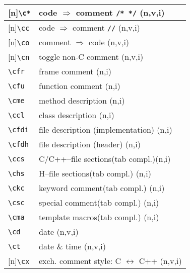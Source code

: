 \documentclass[oneside,11pt,landscape,DIV16]{scrartcl}
\newcommand{\Rep}{{\tiny{[n]}}}
\begin{document}
\begin{multicols}{3}
\begin{center}
\begin{tabular}[]{|p{10mm}|p{60mm}|}
\hline \Rep\verb'\c*'  & code $\Rightarrow$ comment \verb'/* */' \hfill (n,v,i)  \\
\hline \Rep\verb'\cc'  & code $\Rightarrow$ comment \verb'//'    \hfill (n,v,i)\\
\hline \Rep\verb'\co'  & comment $\Rightarrow$ code              \hfill (n,v,i)\\
\hline \Rep\verb'\cn'  & toggle non-C comment                    \hfill (n,v,i)\\
%
\hline \verb'\cfr' & frame comment                               \hfill (n,i)\\
\hline \verb'\cfu' & function comment                            \hfill (n,i)\\
\hline \verb'\cme' & method description                          \hfill (n,i)\\
\hline \verb'\ccl' & class description                           \hfill (n,i)\\
\hline \verb'\cfdi'& file description (implementation)           \hfill (n,i)\\
\hline \verb'\cfdh'& file description (header)                   \hfill (n,i)\\
%
\hline \verb'\ccs'& C/C++--file sections\hspace{3mm}\footnotesize{(tab compl.)}\hfill \normalsize{(n,i)}\\
\hline \verb'\chs'& H--file sections\hspace{10mm}\footnotesize{(tab compl.)}   \hfill \normalsize{(n,i)}\\
\hline \verb'\ckc'& keyword comment\hspace{5mm}\footnotesize{(tab compl.)}     \hfill \normalsize{(n,i)}\\
\hline \verb'\csc'& special comment\hspace{7,5mm}\footnotesize{(tab compl.)}   \hfill \normalsize{(n,i)}\\
\hline \verb'\cma'& template macros\hspace{7,5mm}\footnotesize{(tab compl.)}   \hfill \normalsize{(n,i)}\\
%
\hline \verb'\cd' & date                                                       \hfill (n,v,i)\\
\hline \verb'\ct' & date \& time                                               \hfill (n,v,i)\\
\hline \Rep\verb'\cx' & exch. comment style: C $\leftrightarrow$ C++           \hfill (n,v,i)\\
\hline 
\end{tabular}\\

\end{center}
\end{multicols}
\end{document}
